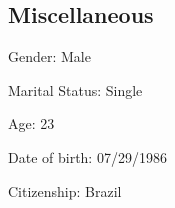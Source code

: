\documentclass[margin,line]{resume}
\begin{document}
\begin{resume}
		
		
			
		
		

    \section{\mysidestyle Miscellaneous}
     \begin {list1}
     	\item[] Gender: Male
     	\item[] Marital Status: Single
     	\item[] Age: 23
     	\item[] Date of birth: 07/29/1986
     	\item[] Citizenship: Brazil
      \item[]
     \end{list1}
   
   


\end{resume}
\end{document}
